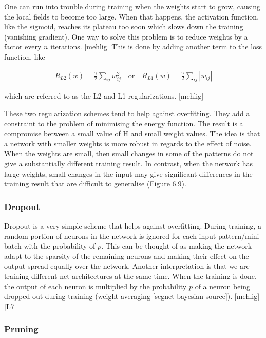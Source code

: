One can run into trouble during training when the weights start to grow, causing the local fields to become too large. When that happens, the activation function, like the sigmoid, reaches its plateau too soon which slows down the training (vanishing gradient). One way to solve this problem is to reduce weights by a factor every $ n $ iterations. [mehlig] This is done by adding another term to the loss function, like

\begin{gather}
	R_{L2}(w) = \frac{\gamma}{2} \sum\limits_{ij} w_{ij}^{2} \quad \text{or} \quad R_{L1}(w) = \frac{\gamma}{2} \sum\limits_{ij} |w_{ij}|
\end{gather}

\noindent which are referred to as the L2 and L1 regularizations. [mehlig]

These two regularization schemes tend to help against overfitting. They add a constraint to the problem of minimising the energy function. The result is a compromise between a small value of H and small weight values. The idea is that a network with smaller weights is more robust in regards to the effect of noise. When the weights are small, then small changes in some of the
patterns do not give a substantially different training result. In contrast, when the network has large weights, small changes in the input may give significant differences in the training result that are difficult to generalise (Figure 6.9).

\subsubsection{Dropout}

Dropout is a very simple scheme that helps against overfitting. During training, a random portion of neurons in the network is ignored for each input pattern/mini-batch with the probability of $ p $. This can be thought of as making the network adapt to the sparsity of the remaining neurons and making their effect on the output spread equally over the network. Another interpretation is that we are training different net architectures at the same time. When the training is done, the output of each neuron is multiplied by the probability $ p $ of a neuron being dropped out during training (weight averaging [segnet bayesian source]).  [mehlig][L7]

\subsubsection{Pruning}

